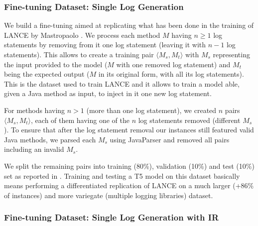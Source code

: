 \subsubsection{Fine-tuning Dataset: Single Log Generation} \label{sec:single-log-dataset}
We build a fine-tuning aimed at replicating what has been done in the training of LANCE by Mastropaolo \etal \cite{mastropaolo2022using}. We process each method $M$ having $n \geq 1$ log statements by removing from it one log statement (\ie leaving it with $n-1$ log statements). This allows to create a training pair $\langle M_s, M_t \rangle$ with $M_s$ representing the input provided to the model (\ie $M$ with one removed log statement) and  $M_t$ being the expected output (\ie $M$ in its original form, with all its log statements). This is the dataset used to train LANCE \cite{mastropaolo2022using} and it allows to train a model able, given a Java method as input, to inject in it one new log statement. 

For methods having $n > 1$ (\ie more than one log statement), we created $n$ pairs $\langle M_s, M_t \rangle$, each of them having one of the $n$ log statements removed (\ie different $M_s$). To ensure that after the log statement removal our instances still featured valid Java methods, we parsed each $M_s$ using JavaParser \cite{javaparser} and removed all pairs including an invalid $M_s$. 

We split the remaining pairs into training (80\%), validation (10\%) and test (10\%) set as reported in . Training and testing a T5 model on this dataset basically means performing a differentiated replication of LANCE on a much larger (+86\% of instances) and more variegate (multiple logging libraries) dataset.

\subsubsection{Fine-tuning Dataset: Single Log Generation with IR} \label{sec:single-log-plus-IR}

